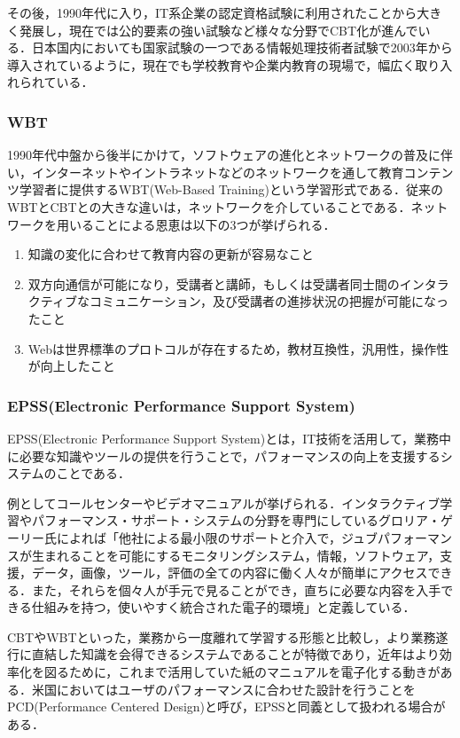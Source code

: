 \documentclass[a4j,12pt]{jsarticle}
\begin{document}
その後，1990年代に入り，IT系企業の認定資格試験に利用されたことから大きく発展し，現在では公的要素の強い試験など様々な分野でCBT化が進んでいる．日本国内においても国家試験の一つである情報処理技術者試験で2003年から導入されているように，現在でも学校教育や企業内教育の現場で，幅広く取り入れられている．

\subsubsection{WBT}
1990年代中盤から後半にかけて，ソフトウェアの進化とネットワークの普及に伴い，インターネットやイントラネットなどのネットワークを通して教育コンテンツ学習者に提供するWBT(Web-Based Training)という学習形式である．従来のWBTとCBTとの大きな違いは，ネットワークを介していることである．ネットワークを用いることによる恩恵は以下の3つが挙げられる．

\begin{enumerate}
\item 知識の変化に合わせて教育内容の更新が容易なこと
\item 双方向通信が可能になり，受講者と講師，もしくは受講者同士間のインタラクティブなコミュニケーション，及び受講者の進捗状況の把握が可能になったこと
\item Webは世界標準のプロトコルが存在するため，教材互換性，汎用性，操作性が向上したこと
\end{enumerate}

\subsubsection{EPSS(Electronic Performance Support System)}
EPSS(Electronic Performance Support System)とは，IT技術を活用して，業務中に必要な知識やツールの提供を行うことで，パフォーマンスの向上を支援するシステムのことである．

例としてコールセンターやビデオマニュアルが挙げられる．インタラクティブ学習やパフォーマンス・サポート・システムの分野を専門にしているグロリア・ゲーリー氏によれば「他社による最小限のサポートと介入で，ジュブパフォーマンスが生まれることを可能にするモニタリングシステム，情報，ソフトウェア，支援，データ，画像，ツール，評価の全ての内容に働く人々が簡単にアクセスできる．また，それらを個々人が手元で見ることができ，直ちに必要な内容を入手できる仕組みを持つ，使いやすく統合された電子的環境」と定義している．

CBTやWBTといった，業務から一度離れて学習する形態と比較し，より業務遂行に直結した知識を会得できるシステムであることが特徴であり，近年はより効率化を図るために，これまで活用していた紙のマニュアルを電子化する動きがある．米国においてはユーザのパフォーマンスに合わせた設計を行うことをPCD(Performance Centered Design)と呼び，EPSSと同義として扱われる場合がある．
\end{document}
